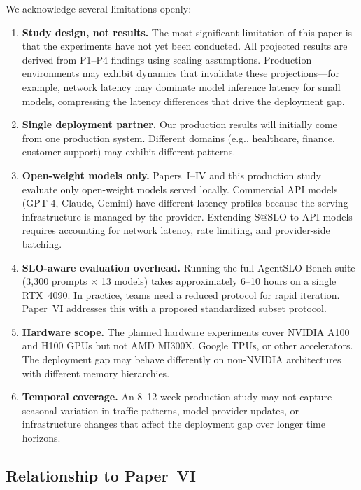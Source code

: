 \documentclass[11pt]{article}
\makeatletter
\newcommand{\sslo}{\ensuremath{\mathrm{S@SLO}}}
\makeatother
\begin{document}
We acknowledge several limitations openly:

\begin{enumerate}[leftmargin=16pt]
    \item \textbf{Study design, not results.} The most significant limitation of this paper is that the experiments have not yet been conducted. All projected results are derived from P1--P4 findings using scaling assumptions. Production environments may exhibit dynamics that invalidate these projections---for example, network latency may dominate model inference latency for small models, compressing the latency differences that drive the deployment gap.

    \item \textbf{Single deployment partner.} Our production results will initially come from one production system. Different domains (e.g., healthcare, finance, customer support) may exhibit different patterns.

    \item \textbf{Open-weight models only.} Papers~I--IV and this production study evaluate only open-weight models served locally. Commercial API models (GPT-4, Claude, Gemini) have different latency profiles because the serving infrastructure is managed by the provider. Extending $\sslo{}$ to API models requires accounting for network latency, rate limiting, and provider-side batching.

    \item \textbf{SLO-aware evaluation overhead.} Running the full AgentSLO-Bench suite (3,300 prompts $\times$ 13 models) takes approximately 6--10 hours on a single RTX~4090. In practice, teams need a reduced protocol for rapid iteration. Paper~VI addresses this with a proposed standardized subset protocol.

    \item \textbf{Hardware scope.} The planned hardware experiments cover NVIDIA A100 and H100 GPUs but not AMD MI300X, Google TPUs, or other accelerators. The deployment gap may behave differently on non-NVIDIA architectures with different memory hierarchies.

    \item \textbf{Temporal coverage.} An 8--12 week production study may not capture seasonal variation in traffic patterns, model provider updates, or infrastructure changes that affect the deployment gap over longer time horizons.
\end{enumerate}

\subsection{Relationship to Paper~VI}
\end{document}
